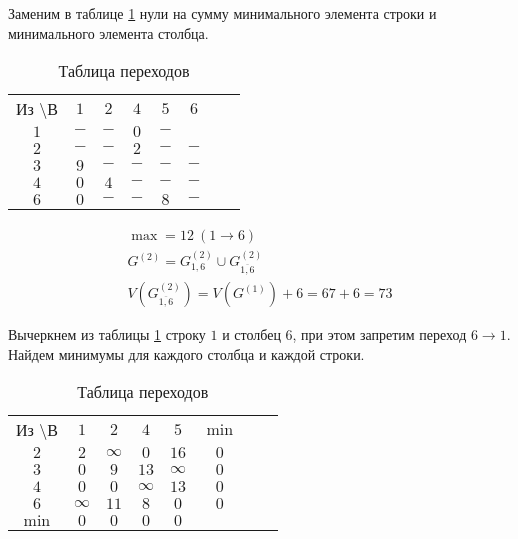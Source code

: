 Заменим в таблице \ref{tab:111} нули на сумму минимального элемента строки и минимального элемента столбца. 

\begin{table}[H]
\begin{center}
	\def\tabcolsep{15pt}
	\caption{Таблица переходов}
	\label{tab:111}
	\begin{tabular}{|c||c|c|c|c|c|c|c|}
		\hline
		Из \textbackslash В & $1$ & $2$ & $4$ & $5$ & $6$ \\
		\hhline{|=#=|=|=|=|=|=|}
		$1$ & $-$ & $-$ & $0$ & $-$ & \redbold{$12$} \\
		\hline
		$2$ & $-$ & $-$ & $2$ & $-$ & $-$ \\
		\hline
		$3$ & $9$ & $-$ & $-$ & $-$ & $-$ \\ 
		\hline
		$4$ & $0$ & $4$ & $-$ & $-$ & $-$ \\
		\hline
		$6$ & $0$ & $-$ & $-$ & $8$ & $-$ \\
		\hline
	\end{tabular}
\end{center}
\end{table}

\begin{gather*}
\max = 12\ (1 \rightarrow 6) \\
G^{(2)} = G_{1,6}^{(2)} \cup G_{\overline{1,6}}^{(2)} \\
V(G_{\overline{1,6}}^{(2)}) = V(G^{(1)}) + 6 = 67 + 6 = 73
\end{gather*}

Вычеркнем из таблицы \ref{tab:111} строку $1$ и столбец $6$, при этом запретим переход $6 \rightarrow 1$. Найдем минимумы для каждого столбца и каждой строки.

\begin{table}[H]
\begin{center}
	\def\tabcolsep{15pt}
	\caption{Таблица переходов}
	\label{tab:112}
	\begin{tabular}{|c||c|c|c|c|c|c|c|}
		\hline
		Из \textbackslash В & $1$ & $2$ & $4$ & $5$ & $\min$ \\
		\hhline{|=#=|=|=|=|=|=|}
		$2$ & $2$ & $\infty$ & $0$ & $16$ & $0$ \\
		\hline
		$3$ & $0$ & $9$ & $13$ & $\infty$ & $0$  \\ 
		\hline
		$4$ & $0$ & $0$ & $\infty$ & $13$ & $0$  \\
		\hline
		$6$ & $\infty$ & $11$ & $8$ & $0$ & $0$  \\
		\hhline{|=#=|=|=|=|=|}
		$\min$ & $0$ & $0$ & $0$ & $0$ & \\ 
		\hline
	\end{tabular}
\end{center}
\end{table}

